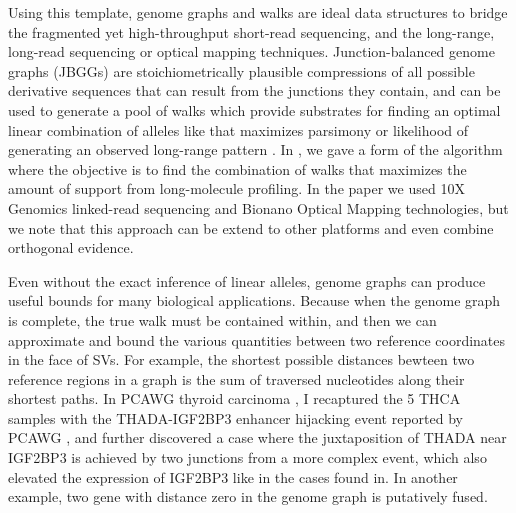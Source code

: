 \documentclass[phd,tocprelim]{cornell}
\begin{document}
Using this template, genome graphs and walks are ideal data structures to bridge the fragmented yet high-throughput short-read sequencing, and the long-range, long-read sequencing or optical mapping techniques. Junction-balanced genome graphs (JBGGs) are stoichiometrically plausible compressions of all possible derivative sequences that can result from the junctions they contain, and can be used to generate a pool of walks which provide substrates for finding an optimal linear combination of alleles like that maximizes parsimony or likelihood of generating an observed long-range pattern \cite{Hadi2020-um}. In \cite{Hadi2020-um}, we gave a form of the algorithm  where the objective is to find the combination of walks that maximizes the amount of support from long-molecule profiling. In the paper we used 10X Genomics linked-read sequencing and Bionano Optical Mapping technologies, but we note that this approach can be extend to other platforms and even combine orthogonal evidence.

Even without the exact inference of linear alleles, genome graphs can produce useful bounds for many biological applications. Because when the genome graph is complete, the true walk must be contained within, and then we can approximate and bound the various quantities between two reference coordinates in the face of SVs. For example, the shortest possible distances bewteen two reference regions in a graph is the sum of traversed nucleotides along their shortest paths. In PCAWG thyroid carcinoma \cite{Panebianco2017-xt}, I recaptured the 5 THCA samples with the THADA-IGF2BP3 enhancer hijacking event reported by PCAWG \cite{Rheinbay2020-no}, and further discovered a case where the juxtaposition of THADA near IGF2BP3 is achieved by two junctions from a more complex event, which also elevated the expression of IGF2BP3 like in the cases found in. In another example, two gene with distance zero in the genome graph is putatively fused.

\end{document}
